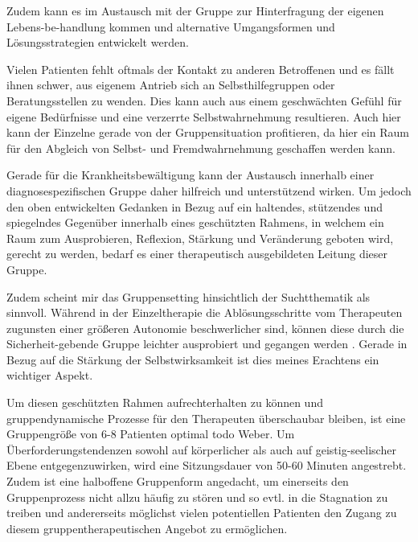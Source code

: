 Zudem kann es im Austausch mit der Gruppe zur Hinterfragung der eigenen Lebens-be-handlung kommen und alternative Umgangsformen und Lösungsstrategien entwickelt werden. 

Vielen Patienten fehlt oftmals der Kontakt zu anderen Betroffenen und es fällt ihnen schwer, aus eigenem Antrieb sich an Selbsthilfegruppen oder Beratungsstellen zu wenden. Dies kann auch aus einem geschwächten Gefühl für eigene Bedürfnisse und eine verzerrte Selbstwahrnehmung resultieren. Auch hier kann der Einzelne gerade von der Gruppensituation profitieren, da hier ein Raum für den Abgleich von Selbst- und Fremdwahrnehmung geschaffen werden kann.

Gerade für die Krankheitsbewältigung kann der Austausch innerhalb einer diagnosespezifischen Gruppe daher hilfreich und unterstützend wirken. Um jedoch den oben entwickelten Gedanken in Bezug auf ein haltendes, stützendes und spiegelndes Gegenüber innerhalb eines geschützten Rahmens, in welchem ein Raum zum Ausprobieren, Reflexion, Stärkung und Veränderung geboten wird, gerecht zu werden, bedarf es einer therapeutisch ausgebildeten Leitung dieser Gruppe. 

Zudem scheint mir das Gruppensetting hinsichtlich der Suchtthematik als sinnvoll. Während in der Einzeltherapie die Ablösungsschritte vom Therapeuten zugunsten einer größeren Autonomie beschwerlicher sind, können diese durch die Sicherheit-gebende Gruppe leichter ausprobiert und gegangen werden \autocite[vgl.]{nawe2014}. Gerade in Bezug auf die Stärkung der Selbstwirksamkeit ist dies meines Erachtens ein wichtiger Aspekt.

Um diesen geschützten Rahmen aufrechterhalten zu können und gruppendynamische Prozesse für den Therapeuten überschaubar bleiben, ist eine Gruppengröße von 6-8 Patienten optimal todo Weber. Um Überforderungstendenzen sowohl auf körperlicher als auch auf geistig-seelischer Ebene entgegenzuwirken, wird eine Sitzungsdauer von 50-60 Minuten angestrebt. Zudem ist eine halboffene Gruppenform angedacht, um einerseits den Gruppenprozess nicht allzu häufig zu stören und so evtl. in die Stagnation zu treiben und andererseits möglichst vielen potentiellen Patienten den Zugang zu diesem gruppentherapeutischen Angebot zu ermöglichen. 

